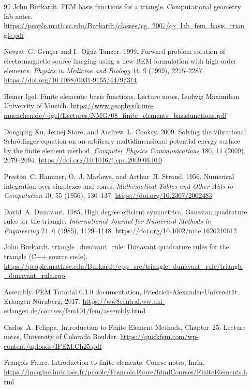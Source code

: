 \documentclass[acmsmall,screen]{MapleTrans}
\begin{document}
\begin{thebibliography}{99}
 John Burkardt. FEM basis functions for a triangle. Computational geometry lab notes. \url{https://people.math.sc.edu/Burkardt/classes/cg_2007/cg_lab_fem_basis_triangle.pdf}

 Nevzat~G. Gen\c{c}er and I.~O\u{g}uz Tanzer. 1999. Forward problem solution of electromagnetic source imaging using a new BEM formulation with high-order elements. \textit{Physics in Medicine and Biology} 44, 9 (1999), 2275--2287. \url{https://doi.org/10.1088/0031-9155/44/9/314}

 Heiner Igel. Finite elements: basis functions. Lecture notes, Ludwig Maximilian University of Munich. \url{https://www.geophysik.uni-muenchen.de/~igel/Lectures/NMG/08_finite_elements_basisfunctions.pdf}

 Dongqing Xu, Jernej Stare, and Andrew~L. Cooksy. 2009. Solving the vibrational Schr\"{o}dinger equation on an arbitrary multidimensional potential energy surface by the finite element method. \textit{Computer Physics Communications} 180, 11 (2009), 2079--2094. \url{https://doi.org/10.1016/j.cpc.2009.06.010}

 Preston~C. Hammer, O.~J. Marlowe, and Arthur~H. Stroud. 1956. Numerical integration over simplexes and cones. \textit{Mathematical Tables and Other Aids to Computation} 10, 55 (1956), 130--137. \url{https://doi.org/10.2307/2002483}

 David~A. Dunavant. 1985. High degree efficient symmetrical Gaussian quadrature rules for the triangle. \textit{International Journal for Numerical Methods in Engineering} 21, 6 (1985), 1129--1148. \url{https://doi.org/10.1002/nme.1620210612}

 John Burkardt. triangle\_dunavant\_rule: Dunavant quadrature rules for the triangle (C++ source code). \url{https://people.math.sc.edu/Burkardt/cpp_src/triangle_dunavant_rule/triangle_dunavant_rule.cpp}

 Assembly. FEM Tutorial 0.1.0 documentation, Friedrich-Alexander-Universit\"{a}t Erlangen-N\"{u}rnberg, 2017. \url{https://ww8central.ww.uni-erlangen.de/courses/fem101/fem/assembly.html}

 Carlos~A. Felippa. Introduction to Finite Element Methods, Chapter~25. Lecture notes, University of Colorado Boulder. \url{https://quickfem.com/wp-content/uploads/IFEM.Ch25.pdf}

 Fran\c{c}ois Faure. Introduction to finite elements. Course notes, Inria. \url{https://imagine.inrialpes.fr/people/Francois.Faure/htmlCourses/FiniteElements.html}


\end{thebibliography}
\end{document}
